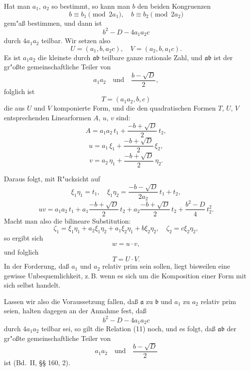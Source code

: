 \documentclass[12pt,a4paper]{article}
\theoremstyle{plain}
\begin{document}
Hat man $a_1$, $a_2$ so bestimmt, so kann man $b$ den beiden Kongruenzen
\[
b \equiv b_1 \pmod{2a_1},\quad b \equiv b_2 \pmod{2a_2}
\]
gem"a\ss{} bestimmen, und dann ist
\[
b^2 - D - 4a_1 a_2 c
\]
durch $4a_1 a_2$ teilbar. Wir setzen also
\[
U = (a_1, b, a_2 c),\quad V = (a_2, b, a_1 c).
\]
Es ist $a_1 a_2$ die kleinste durch $\mathfrak{a}\mathfrak{b}$ teilbare ganze rationale Zahl, und $\mathfrak{a}\mathfrak{b}$ ist der gr"o\ss te gemeinschaftliche Teiler von
\[
a_1 a_2\quad \text{und}\quad \frac{b - \sqrt{D}}{2},
\]
folglich ist
\begin{equation}
T = (a_1 a_2, b, c)
\tag{10}
\end{equation}
die aus $U$ und $V$ komponierte Form, und die den quadratischen Formen $T$, $U$, $V$ entsprechenden Linearformen $A$, $u$, $v$ sind:
\[
A = a_1 a_2\,t_1 + \frac{-b + \sqrt{D}}{2}\,t_2,
\]
\[
u = a_1\,\xi_1 + \frac{-b + \sqrt{D}}{2}\,\xi_2,
\]
\[
v = a_2\,\eta_1 + \frac{-b + \sqrt{D}}{2}\,\eta_2.
\]

Daraus folgt, mit R"ucksicht auf
\[
\xi_1\eta_1 = t_1,\quad \xi_1\eta_2 = \frac{-b - \sqrt{D}}{2a_2}\,t_1 + t_2,
\]
\begin{equation}
u v = a_1 a_2\,t_1 + a_1\frac{-b + \sqrt{D}}{2}\,t_2 + a_2\frac{-b + \sqrt{D}}{2}\,t_2 + \frac{b^2 - D}{4}\,t_2^2.
\tag{11}
\end{equation}
Macht man also die bilineare Substitution:
\[
\zeta_1 = \xi_1\eta_1 + a_2\xi_1\eta_2 + a_1\xi_2\eta_1 + b\xi_2\eta_2,\quad \zeta_2 = c\xi_2\eta_2,
\]
so ergibt sich
\begin{equation}
w = u \cdot v,
\tag{12}
\end{equation}
und folglich
\begin{equation}
T = U \cdot V.
\tag{13}
\end{equation}
In der Forderung, da\ss{} $a_1$ und $a_2$ relativ prim sein sollen, liegt bisweilen eine gewisse Unbequemlichkeit, z.\,B. wenn es sich um die Komposition einer Form mit sich selbst handelt.

Lassen wir also die Voraussetzung fallen, da\ss{} $\mathfrak{a}$ zu $\mathfrak{b}$ und $a_1$ zu $a_2$ relativ prim seien, halten dagegen an der Annahme fest, da\ss{}
\begin{equation}
b^2 - D - 4a_1 a_2 c
\tag{15}
\end{equation}
durch $4a_1 a_2$ teilbar sei, so gilt die Relation (11) noch, und es folgt, da\ss{} $\mathfrak{a}\mathfrak{b}$ der gr"o\ss te gemeinschaftliche Teiler von
\[
a_1 a_2\quad \text{und}\quad \frac{b - \sqrt{D}}{2}
\]
ist (Bd.~II, \S\S{} 160, 2).
\end{document}
